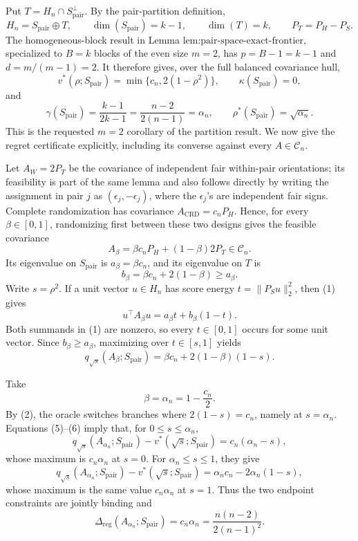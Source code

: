 Put \(T=H_n\cap S_{\mathrm{pair}}^\perp\).  By the pair-partition definition,
\[
 H_n=S_{\mathrm{pair}}\mathbin\oplus T,
 \qquad
 \dim(S_{\mathrm{pair}})=k-1,
 \qquad
 \dim(T)=k,
 \qquad
 P_T=P_H-P_S.
 \tag{1}
\]
The homogeneous-block result in Lemma \(\text{lem:pair-space-exact-frontier}\), specialized to \(B=k\) blocks of the even size \(m=2\), has \(p=B-1=k-1\) and \(d=m/(m-1)=2\).  It therefore gives, over the full balanced covariance hull,
\[
 v^*(\rho;S_{\mathrm{pair}})
 =\min\{c_n,2(1-\rho^2)\},
 \qquad
 \kappa(S_{\mathrm{pair}})=0,
 \tag{2}
\]
and
\[
 \gamma(S_{\mathrm{pair}})
 =\frac{k-1}{2k-1}
 =\frac{n-2}{2(n-1)}
 =\alpha_n,
 \qquad
 \rho^*(S_{\mathrm{pair}})=\sqrt{\alpha_n}.
 \tag{3}
\]
This is the requested \(m=2\) corollary of the partition result.  We now give the regret certificate explicitly, including its converse against every \(A\in\mathcal C_n\).

Let \(A_W=2P_T\) be the covariance of independent fair within-pair orientations; its feasibility is part of the same lemma and also follows directly by writing the assignment in pair \(j\) as \((\epsilon_j,-\epsilon_j)\), where the \(\epsilon_j\)'s are independent fair signs.  Complete randomization has covariance \(A_{\mathrm{CRD}}=c_nP_H\).  Hence, for every \(\beta\in[0,1]\), randomizing first between these two designs gives the feasible covariance
\[
 A_\beta=\beta c_nP_H+(1-\beta)2P_T\in\mathcal C_n.
 \tag{4}
\]
Its eigenvalue on \(S_{\mathrm{pair}}\) is
\(a_\beta=\beta c_n\), and its eigenvalue on \(T\) is
\[
 b_\beta=\beta c_n+2(1-\beta)\geq a_\beta.
\]
Write \(s=\rho^2\).  If a unit vector \(u\in H_n\) has score energy
\(t=\|P_Su\|_2^2\), then (1) gives
\[
 u^\top A_\beta u=a_\beta t+b_\beta(1-t).
\]
Both summands in (1) are nonzero, so every \(t\in[0,1]\) occurs for some unit vector.  Since \(b_\beta\geq a_\beta\), maximizing over \(t\in[s,1]\) yields
\[
 q_{\sqrt{s}}(A_\beta;S_{\mathrm{pair}})
 =\beta c_n+2(1-\beta)(1-s).
 \tag{5}
\]

Take
\[
 \beta=\alpha_n=1-\frac{c_n}{2}.
 \tag{6}
\]
By (2), the oracle switches branches where \(2(1-s)=c_n\), namely at \(s=\alpha_n\).  Equations (5)--(6) imply that, for \(0\leq s\leq\alpha_n\),
\[
 q_{\sqrt{s}}(A_{\alpha_n};S_{\mathrm{pair}})
 -v^*(\sqrt{s};S_{\mathrm{pair}})
 =c_n(\alpha_n-s),
 \tag{7}
\]
whose maximum is \(c_n\alpha_n\) at \(s=0\).  For \(\alpha_n\leq s\leq1\), they give
\[
 q_{\sqrt{s}}(A_{\alpha_n};S_{\mathrm{pair}})
 -v^*(\sqrt{s};S_{\mathrm{pair}})
 =\alpha_nc_n-2\alpha_n(1-s),
 \tag{8}
\]
whose maximum is the same value \(c_n\alpha_n\) at \(s=1\).  Thus the two endpoint constraints are jointly binding and
\[
 \Delta_{\mathrm{reg}}(A_{\alpha_n};S_{\mathrm{pair}})
 =c_n\alpha_n
 =\frac{n(n-2)}{2(n-1)^2}.
 \tag{9}
\]


